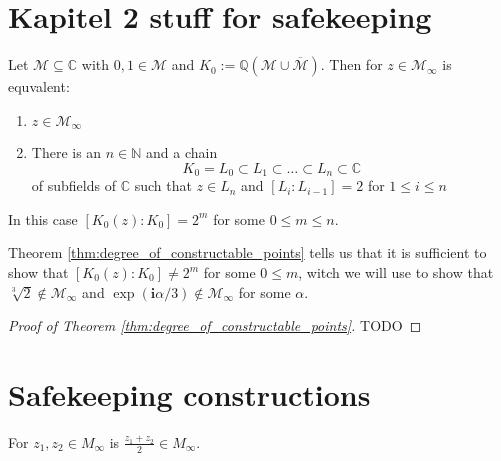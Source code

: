 \section{Kapitel 2 stuff for safekeeping}

\begin{theorem}
\label{thm:degree_of_constructable_points}
    Let $\mathcal{M}\subseteq\mathbb{C}$ with $0,1 \in \mathcal{M}$ and $K_0 := \mathbb{Q}(\mathcal{M}\cup \overline{\mathcal{M}})$.
    Then for $z \in \mathcal{M}_{\infty}$ is equvalent:
    \begin{enumerate}
        \item $z \in \mathcal{M}_{\infty}$
        \item There is an $n \in \mathbb{N}$ and a chain \begin{equation*}
            K_0 = L_0 \subset L_1 \subset \dots \subset L_n \subset \mathbb{C}
        \end{equation*}
        of subfields of $\mathbb{C}$ such that $z \in L_n$ and $[L_i:L_{i-1}] =2$ for $1\le i\le n$ %
    \end{enumerate}
    In this case $[K_0(z):K_0] = 2^m$ for some $0 \le m \le n$.
\end{theorem}
\begin{remark}
    Theorem \ref{thm:degree_of_constructable_points} tells us that it is sufficient to show that $[K_0(z):K_0] \ne 2^m$ for some $0 \le m $, witch we will use to show that $\sqrt[3]{2} \notin \mathcal{M}_{\infty}$ and $\exp(\textbf{i} \alpha/3) \notin \mathcal{M}_{\infty}$ for some $\alpha$.
\end{remark}
\begin{proof}[Proof of Theorem \ref{thm:degree_of_constructable_points}]
    TODO %
\end{proof}

\section{Safekeeping constructions}

\begin{lemma}
    \label{lem:construction_midpoint}
    For $z_1, z_2 \in M_{\infty}$ is $\frac{z_1 + z_2}{2} \in M_{\infty}$.
\end{lemma}

